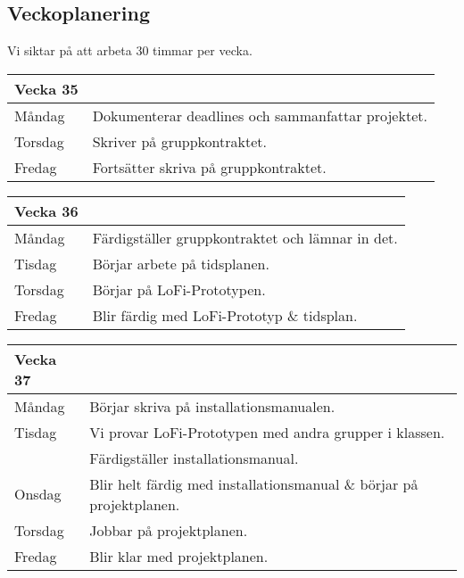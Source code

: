 \documentclass{liu_mall}
\begin{document}
    \subsection{Veckoplanering}
        Vi siktar på att arbeta 30 timmar per vecka.
        \begin{table}[!h]
            \begin{tabularx}{\textwidth}{l|l}
                Vecka 35\\\hline
                Måndag  & Dokumenterar deadlines och sammanfattar projektet.\\
                Torsdag & Skriver på gruppkontraktet.\\
                Fredag  & Fortsätter skriva på gruppkontraktet.\\
            \end{tabularx}
        \end{table}

        \begin{table}[!h]
            \begin{tabularx}{\textwidth}{l|l}
                Vecka 36\\\hline
                Måndag  & Färdigställer gruppkontraktet och lämnar in det.\\
                Tisdag  & Börjar arbete på tidsplanen.\\
                Torsdag & Börjar på LoFi-Prototypen.\\
                Fredag  & Blir färdig med LoFi-Prototyp \& tidsplan.\\
            \end{tabularx}
        \end{table}
        
        \begin{table}[!h]
            \begin{tabularx}{\textwidth}{l|l}
                Vecka 37\\\hline
                Måndag  & Börjar skriva på installationsmanualen.\\
                Tisdag  & Vi provar LoFi-Prototypen med andra grupper i klassen.\\
                        & Färdigställer installationsmanual.\\
                Onsdag  & Blir helt färdig med installationsmanual \& börjar på projektplanen.\\
                Torsdag & Jobbar på projektplanen.\\
                Fredag  & Blir klar med projektplanen.\\
            \end{tabularx}
        \end{table}
        
\end{document}

